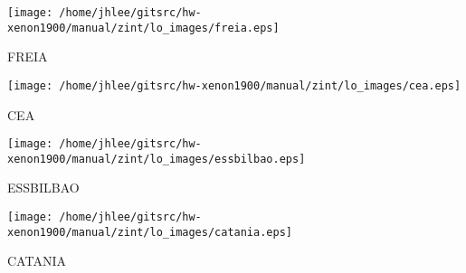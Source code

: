 \noindent
\vspace{1cm}
\begin{minipage}{.2\textwidth}
\begin{center}
\texttt{[image: /home/jhlee/gitsrc/hw-xenon1900/manual/zint/lo\_images/freia.eps]}
\end{center}
\end{minipage}
\begin{minipage}{.7\textwidth}
FREIA
\end{minipage}


\noindent
\vspace{1cm}
\begin{minipage}{.2\textwidth}
\begin{center}
\texttt{[image: /home/jhlee/gitsrc/hw-xenon1900/manual/zint/lo\_images/cea.eps]}
\end{center}
\end{minipage}
\begin{minipage}{.7\textwidth}
CEA
\end{minipage}


\noindent
\vspace{1cm}
\begin{minipage}{.2\textwidth}
\begin{center}
\texttt{[image: /home/jhlee/gitsrc/hw-xenon1900/manual/zint/lo\_images/essbilbao.eps]}
\end{center}
\end{minipage}
\begin{minipage}{.7\textwidth}
ESSBILBAO
\end{minipage}


\noindent
\vspace{1cm}
\begin{minipage}{.2\textwidth}
\begin{center}
\texttt{[image: /home/jhlee/gitsrc/hw-xenon1900/manual/zint/lo\_images/catania.eps]}
\end{center}
\end{minipage}
\begin{minipage}{.7\textwidth}
CATANIA
\end{minipage}


